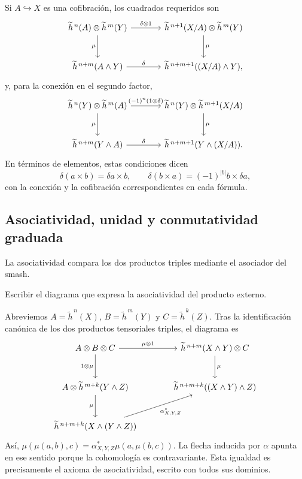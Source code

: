 Si $A\hookrightarrow X$ es una cofibración, los cuadrados requeridos son
\[
\begin{tikzcd}[column sep=large,row sep=large]
\widetilde h^{\,n}(A)\otimes\widetilde h^{\,m}(Y)
 \arrow[r,"\delta\otimes1"]\arrow[d,"\mu"']&
\widetilde h^{\,n+1}(X/A)\otimes\widetilde h^{\,m}(Y)\arrow[d,"\mu"]\\
\widetilde h^{\,n+m}(A\wedge Y)\arrow[r,"\delta"]&
\widetilde h^{\,n+m+1}((X/A)\wedge Y),
\end{tikzcd}
\]
y, para la conexión en el segundo factor,
\[
\begin{tikzcd}[column sep=large,row sep=large]
\widetilde h^{\,n}(Y)\otimes\widetilde h^{\,m}(A)
 \arrow[r,"(-1)^n(1\otimes\delta)"]\arrow[d,"\mu"']&
\widetilde h^{\,n}(Y)\otimes\widetilde h^{\,m+1}(X/A)\arrow[d,"\mu"]\\
\widetilde h^{\,n+m}(Y\wedge A)\arrow[r,"\delta"]&
\widetilde h^{\,n+m+1}(Y\wedge(X/A)).
\end{tikzcd}
\]
En términos de elementos, estas condiciones dicen
\[
\delta(a\times b)=\delta a\times b,
\qquad
\delta(b\times a)=(-1)^{|b|}b\times\delta a,
\]
con la conexión y la cofibración correspondientes en cada fórmula.

\subsection{Asociatividad, unidad y conmutatividad graduada}
La asociatividad compara los dos productos triples mediante el asociador del smash.

\begin{ejer}\label{ejer:c24-asociatividad}
Escribir el diagrama que expresa la asociatividad del producto externo.
\end{ejer}
\begin{sol}
Abreviemos $A=\widetilde h^{\,n}(X)$, $B=\widetilde h^{\,m}(Y)$ y $C=\widetilde h^{\,k}(Z)$. Tras la identificación canónica de los dos productos tensoriales triples, el diagrama es
\[
\begin{tikzcd}[column sep=large,row sep=large]
A\otimes B\otimes C\arrow[r,"\mu\otimes1"]\arrow[d,"1\otimes\mu"']&
\widetilde h^{\,n+m}(X\wedge Y)\otimes C\arrow[d,"\mu"]\\
A\otimes\widetilde h^{\,m+k}(Y\wedge Z)\arrow[d,"\mu"']&
\widetilde h^{\,n+m+k}((X\wedge Y)\wedge Z)\\
\widetilde h^{\,n+m+k}(X\wedge(Y\wedge Z))\arrow[ur,"\alpha_{X,Y,Z}^{*}"']&
\end{tikzcd}
\]
Así, $\mu(\mu(a,b),c)=\alpha_{X,Y,Z}^{*}\mu(a,\mu(b,c))$. La flecha inducida por $\alpha$ apunta en ese sentido porque la cohomología es contravariante. Esta igualdad es precisamente el axioma de asociatividad, escrito con todos sus dominios.
\end{sol}

